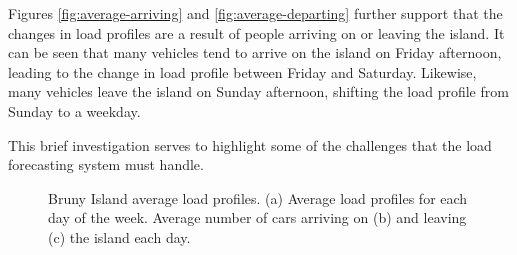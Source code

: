 Figures \ref{fig:average-arriving} and \ref{fig:average-departing} further support that the changes in load profiles are a result of people arriving on or leaving the island.
It can be seen that many vehicles tend to arrive on the island on Friday afternoon, leading to the change in load profile between Friday and Saturday.
Likewise, many vehicles leave the island on Sunday afternoon, shifting the load profile from Sunday to a weekday.

This brief investigation serves to highlight some of the challenges that the load forecasting system must handle.

\begin{figure}[htbp]
	\centering
	\vfil
	\vfil
	\caption{Bruny Island average load profiles. (a) Average load profiles for each day of the week. Average number of cars arriving on (b) and leaving (c) the island each day.}
	\label{fig:average-load-profiles}
\end{figure}

